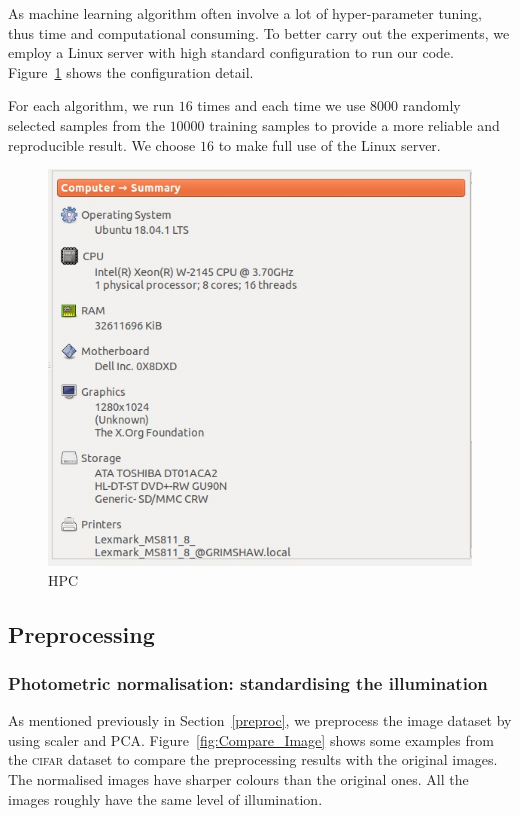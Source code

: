 \documentclass[12pt]{article} %
\begin{document}
As machine learning algorithm often involve a lot of hyper-parameter tuning, thus time and computational consuming. To better carry out the experiments, we employ a Linux server with high standard configuration to run our code. Figure~\ref{fig:HPC} shows the configuration detail. 

For each algorithm, we run $16$ times and each time we use $8000$ randomly selected samples from the $10000$ training samples to provide a more reliable and reproducible result. We choose $16$ to make full use of the Linux server.
\begin{figure}
    \centering
	\includegraphics[scale=.5]{hpc}
	\caption{HPC}
	\label{fig:HPC}
\end{figure}

\subsection{Preprocessing}
\subsubsection{Photometric normalisation: standardising the illumination}
As mentioned previously in Section~\ref{preproc}, we preprocess the image dataset by using scaler and PCA. 
Figure~\ref{fig:Compare_Image} shows some examples from the 
\textsc{cifar} dataset to compare the preprocessing results with the original images. 
The normalised images have sharper colours than the original ones. All the images roughly have the same level of illumination.  
\end{document}
